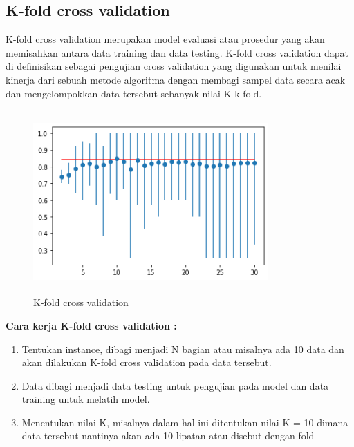 	\subsection{K-fold cross validation}
	K-fold cross validation merupakan model evaluasi atau prosedur yang akan memisahkan antara data training dan data testing. K-fold cross validation dapat di definisikan sebagai pengujian cross validation yang digunakan untuk menilai kinerja dari sebuah metode algoritma dengan membagi sampel data secara acak dan mengelompokkan data tersebut sebanyak nilai K k-fold.
	\begin{figure}[!htbp]
		\centering
		\includegraphics[width=9cm,height=7cm]{figures/kvold_validation.png}
		\caption{K-fold cross validation}
		\label{penanda}
	\end{figure}
	\newline
	\textbf {Cara kerja K-fold cross validation : }
	\begin{enumerate}
		\item Tentukan instance, dibagi menjadi N bagian atau misalnya ada 10 data dan akan dilakukan K-fold cross validation pada data tersebut.
		\item Data dibagi menjadi data testing untuk pengujian pada model dan data training untuk melatih model. 
		\item Menentukan nilai K, misalnya dalam hal ini ditentukan nilai K = 10 dimana data tersebut nantinya akan ada 10 lipatan atau disebut dengan fold
	\end{enumerate}

